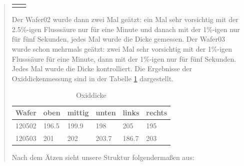\begin{quote}
\begin{center}
\begin{tabular}{ll}
\begin{minipage}{0.40\textwidth}
                    \end{minipage}

                \end{tabular}
			\end{center}

    		\vspace{2em}


			Der Wafer02 wurde dann zwei Mal geätzt: ein Mal sehr vorsichtig mit
			der 2.5\%-igen Flusssäure nur für eine Minute und danach mit der
			1\%-igen nur für fünf Sekunden, jedes Mal wurde die Dicke gemessen.
			Der Wafer03 wurde  schon mehrmals  geätzt: zwei Mal sehr vorsichtig
			mit der 1\%-igen Flusssäure für eine Minute, dann mit der 1\%-igen
			nur für fünf Sekunden. Jedes Mal wurde die Dicke kontrolliert.
			Die Ergebnisse der Oxiddickenmessung sind in der Tabelle
			\ref{tab:Oxiddicke} dargestellt.

			\vspace{2em}

      		\begin{table}[H]
     		  \begin{addmargin}[1cm]{3cm}
     			\centering
                    \begin{tabular}{|p{2cm}|p{2cm}|p{2cm}|p{2cm}|p{2cm}|p{2cm}|}
         			\hline
         			Wafer & oben & mittig & unten & links & rechts\\
         			\hline
        			120502 & 196.5  & 199.9  & 198   & 205   & 195 \\
                    120503 & 201 	& 202 	 & 203.7 & 186.7 & 203 \\
                    \hline

                    \end{tabular}
              \end{addmargin}
              \caption{Oxiddicke}
              \label{tab:Oxiddicke}
            \end{table}

            \vspace{2em}

            Nach dem Ätzen sieht unsere Struktur folgendermaßen aus:

            \vspace{2em}


\end{quote}
